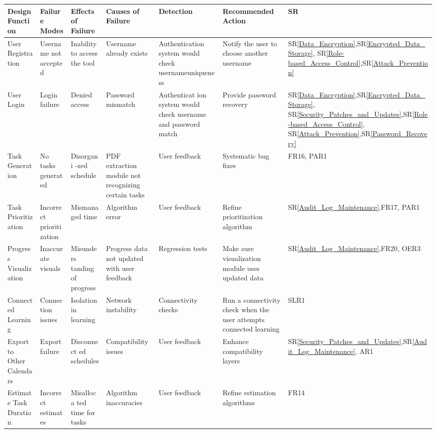 \documentclass{article}
\newcommand{\srref}[1]{SR\ref{#1}}
\begin{document}
\begin{longtable}{|p{1.5cm}|p{1.5cm}|p{1.5cm}|p{2cm}|p{2cm}|p{2cm}|p{1.5cm}|}
  \hline
  \textbf{Design Function} & \textbf{Failure Modes} & \textbf{Effects of Failure} & \textbf{Causes of Failure} & \textbf{Detection} & \textbf{Recommended Action} & \textbf{SR} \\
  \hline
  User Registration & Username not accepted & Inability to access the tool & Username already exists & Authenticati\-on system would check username\newline uniqueness & Notify the user to choose another username & \srref{Data_Encryption},\srref{Encrypted_Data_Storage}, \srref{Role-based_Access_Control},\srref{Attack_Prevention} \\
  \hline
  User Login & Login failure & Denied access & Password mismatch & Authenticat \-ion system would check username and password match & Provide password recovery & \srref{Data_Encryption},\srref{Encrypted_Data_Storage}, \srref{Security_Patches_and_Updates},\srref{Role-based_Access_Control}, \srref{Attack_Prevention},\srref{Password_Recovery} \\
  \hline
  Task Generation & No tasks generated & Disorgani -zed schedule & PDF extraction module not recognizing certain tasks & User feedback & Systematic bug fixes & FR16, PAR1 \\
  \hline
  Task Prioritization & Incorrect prioritization & Mismana \-ged time & Algorithm error & User feedback & Refine prioritization algorithm & \srref{Audit_Log_Maintenance},FR17, PAR1 \\
  \hline
  Progress Visualization & Inaccurate visuals & Misunders \-tanding of progress & Progress data not updated with user feedback & Regression tests & Make sure visualization module uses updated data & \srref{Audit_Log_Maintenance},FR20, OER3 \\
  \hline
  Connected Learning & Connection issues & Isolation in learning & Network instability & Connectivity checks & Run a connectivity check when the user attempts connected learning & SLR1 \\
  \hline
  Export to Other Calendars & Export failure & Disconnect \-ed schedules & Compatibility issues & User feedback & Enhance compatibility layers & \srref{Security_Patches_and_Updates},\srref{Audit_Log_Maintenance}, AR1 \\
  \hline
  Estimate Task Duration & Incorrect estimates & Misalloca \-ted time for tasks & Algorithm inaccuracies & User feedback & Refine estimation algorithms & FR14 \\
  \hline
  \end{longtable}
  
\end{document}
